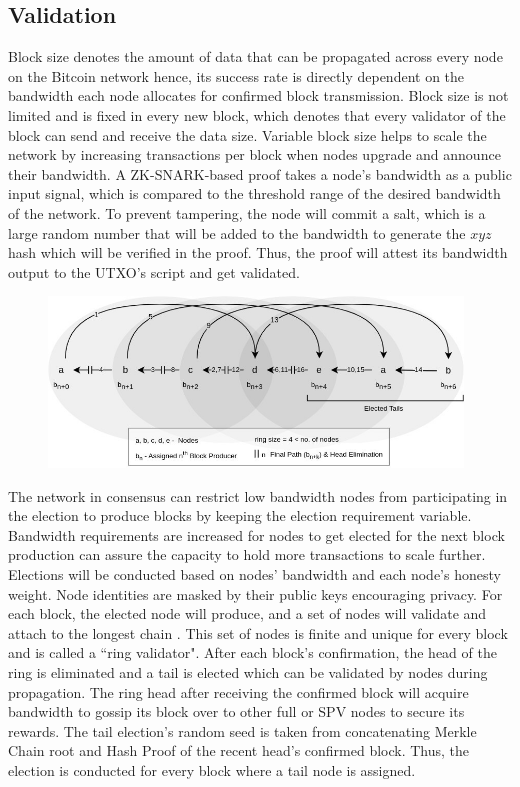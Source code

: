 \documentclass[a4paper,10pt]{article}
\begin{document}
\subsection{Validation}
Block size denotes the amount of data that can be propagated across every node on the Bitcoin network hence, its success rate is directly dependent on the bandwidth each node allocates for confirmed block transmission. Block size is not limited and is fixed in every new block, which denotes that every validator of the block can send and receive the data size. Variable block size helps to scale the network by increasing transactions per block when nodes upgrade and announce their bandwidth. A ZK-SNARK-based proof takes a node’s bandwidth as a public input signal, which is compared to the threshold range of the desired bandwidth of the network. To prevent tampering, the node will commit a salt, which is a large random number that will be added to the bandwidth to generate the $xyz$ hash which will be verified in the proof. Thus, the proof will attest its bandwidth output to the UTXO’s script and get validated. 
\begin{figure}[h]
\begin{center}
\includegraphics[width=11cm]{ring}
\end{center}
\end{figure}
The network in consensus can restrict low bandwidth nodes from participating in the election to produce blocks by keeping the election requirement variable. Bandwidth requirements are increased for nodes to get elected for the next block production can assure the capacity to hold more transactions to scale further. Elections will be conducted based on nodes' bandwidth and each node's honesty weight. Node identities are masked by their public keys encouraging privacy. For each block, the elected node will produce, and a set of nodes will validate and attach to the longest chain \cite{nakamoto2008bitcoin}. This set of nodes is finite and unique for every block and is called a ``ring validator". After each block's confirmation, the head of the ring is eliminated and a tail is elected which can be validated by nodes during propagation. The ring head after receiving the confirmed block will acquire bandwidth to gossip its block over to other full or SPV nodes to secure its rewards. The tail election's random seed is taken from concatenating Merkle Chain root and Hash Proof \cite{yakovenko2018solana} of the recent head's confirmed block. Thus, the election is conducted for every block where a tail node is assigned.
\end{document}
